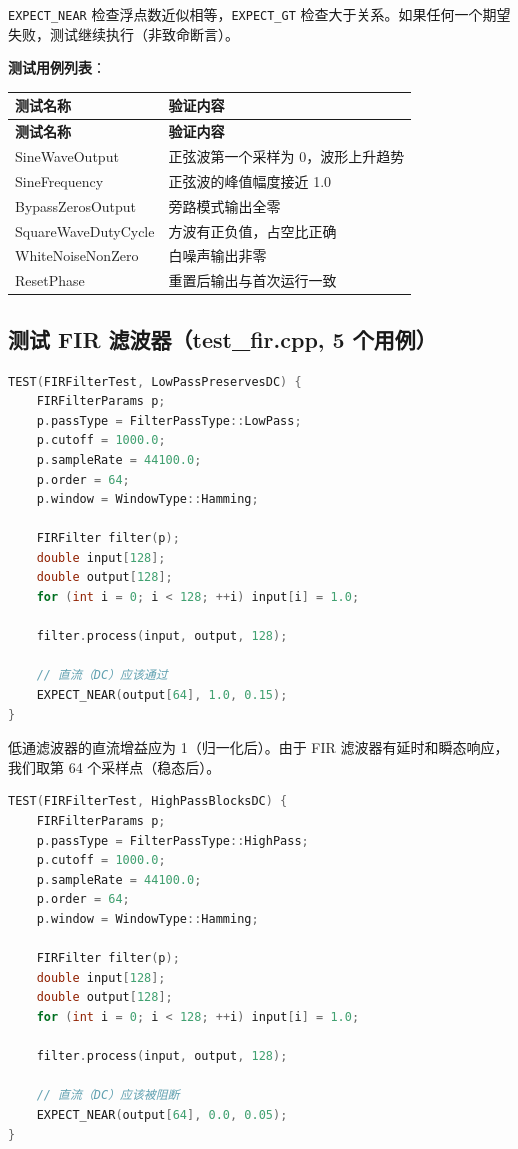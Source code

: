 ﻿\documentclass[12pt,a4paper,oneside]{ctexbook}
\begin{document}
\texttt{EXPECT\_NEAR} 检查浮点数近似相等，\texttt{EXPECT\_GT} 检查大于关系。如果任何一个期望失败，测试继续执行（非致命断言）。

\textbf{测试用例列表}：

\begin{longtable}{p{4cm}p{9cm}}
    \toprule
    \textbf{测试名称} & \textbf{验证内容} \\
    \midrule
    \endfirsthead
    \toprule
    \textbf{测试名称} & \textbf{验证内容} \\
    \midrule
    \endhead
    \bottomrule
    \endfoot
    SineWaveOutput & 正弦波第一个采样为 0，波形上升趋势 \\
    SineFrequency & 正弦波的峰值幅度接近 1.0 \\
    BypassZerosOutput & 旁路模式输出全零 \\
    SquareWaveDutyCycle & 方波有正负值，占空比正确 \\
    WhiteNoiseNonZero & 白噪声输出非零 \\
    ResetPhase & 重置后输出与首次运行一致 \\
    \bottomrule
\end{longtable}

\subsection{测试 FIR 滤波器（test\_fir.cpp, 5 个用例）}

\begin{lstlisting}[language=C++, caption={FIR 低通通过直流测试}]
TEST(FIRFilterTest, LowPassPreservesDC) {
    FIRFilterParams p;
    p.passType = FilterPassType::LowPass;
    p.cutoff = 1000.0;
    p.sampleRate = 44100.0;
    p.order = 64;
    p.window = WindowType::Hamming;

    FIRFilter filter(p);
    double input[128];
    double output[128];
    for (int i = 0; i < 128; ++i) input[i] = 1.0;

    filter.process(input, output, 128);

    // 直流（DC）应该通过
    EXPECT_NEAR(output[64], 1.0, 0.15);
}
\end{lstlisting}

低通滤波器的直流增益应为 1（归一化后）。由于 FIR 滤波器有延时和瞬态响应，我们取第 64 个采样点（稳态后）。

\begin{lstlisting}[language=C++, caption={FIR 高通阻断直流测试}]
TEST(FIRFilterTest, HighPassBlocksDC) {
    FIRFilterParams p;
    p.passType = FilterPassType::HighPass;
    p.cutoff = 1000.0;
    p.sampleRate = 44100.0;
    p.order = 64;
    p.window = WindowType::Hamming;

    FIRFilter filter(p);
    double input[128];
    double output[128];
    for (int i = 0; i < 128; ++i) input[i] = 1.0;

    filter.process(input, output, 128);

    // 直流（DC）应该被阻断
    EXPECT_NEAR(output[64], 0.0, 0.05);
}
\end{lstlisting}
\end{document}
